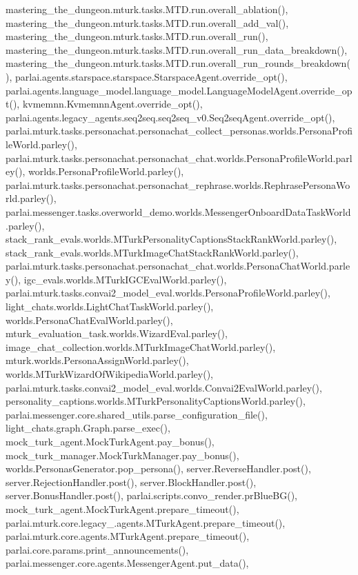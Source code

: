 mastering\+\_\+the\+\_\+dungeon.\+mturk.\+tasks.\+M\+T\+D.\+run.\+overall\+\_\+ablation(), mastering\+\_\+the\+\_\+dungeon.\+mturk.\+tasks.\+M\+T\+D.\+run.\+overall\+\_\+add\+\_\+val(), mastering\+\_\+the\+\_\+dungeon.\+mturk.\+tasks.\+M\+T\+D.\+run.\+overall\+\_\+run(), mastering\+\_\+the\+\_\+dungeon.\+mturk.\+tasks.\+M\+T\+D.\+run.\+overall\+\_\+run\+\_\+data\+\_\+breakdown(), mastering\+\_\+the\+\_\+dungeon.\+mturk.\+tasks.\+M\+T\+D.\+run.\+overall\+\_\+run\+\_\+rounds\+\_\+breakdown(), parlai.\+agents.\+starspace.\+starspace.\+Starspace\+Agent.\+override\+\_\+opt(), parlai.\+agents.\+language\+\_\+model.\+language\+\_\+model.\+Language\+Model\+Agent.\+override\+\_\+opt(), kvmemnn.\+Kvmemnn\+Agent.\+override\+\_\+opt(), parlai.\+agents.\+legacy\+\_\+agents.\+seq2seq.\+seq2seq\+\_\+v0.\+Seq2seq\+Agent.\+override\+\_\+opt(), parlai.\+mturk.\+tasks.\+personachat.\+personachat\+\_\+collect\+\_\+personas.\+worlds.\+Persona\+Profile\+World.\+parley(), parlai.\+mturk.\+tasks.\+personachat.\+personachat\+\_\+chat.\+worlds.\+Persona\+Profile\+World.\+parley(), worlds.\+Persona\+Profile\+World.\+parley(), parlai.\+mturk.\+tasks.\+personachat.\+personachat\+\_\+rephrase.\+worlds.\+Rephrase\+Persona\+World.\+parley(), parlai.\+messenger.\+tasks.\+overworld\+\_\+demo.\+worlds.\+Messenger\+Onboard\+Data\+Task\+World.\+parley(), stack\+\_\+rank\+\_\+evals.\+worlds.\+M\+Turk\+Personality\+Captions\+Stack\+Rank\+World.\+parley(), stack\+\_\+rank\+\_\+evals.\+worlds.\+M\+Turk\+Image\+Chat\+Stack\+Rank\+World.\+parley(), parlai.\+mturk.\+tasks.\+personachat.\+personachat\+\_\+chat.\+worlds.\+Persona\+Chat\+World.\+parley(), igc\+\_\+evals.\+worlds.\+M\+Turk\+I\+G\+C\+Eval\+World.\+parley(), parlai.\+mturk.\+tasks.\+convai2\+\_\+model\+\_\+eval.\+worlds.\+Persona\+Profile\+World.\+parley(), light\+\_\+chats.\+worlds.\+Light\+Chat\+Task\+World.\+parley(), worlds.\+Persona\+Chat\+Eval\+World.\+parley(), mturk\+\_\+evaluation\+\_\+task.\+worlds.\+Wizard\+Eval.\+parley(), image\+\_\+chat\+\_\+collection.\+worlds.\+M\+Turk\+Image\+Chat\+World.\+parley(), mturk.\+worlds.\+Persona\+Assign\+World.\+parley(), worlds.\+M\+Turk\+Wizard\+Of\+Wikipedia\+World.\+parley(), parlai.\+mturk.\+tasks.\+convai2\+\_\+model\+\_\+eval.\+worlds.\+Convai2\+Eval\+World.\+parley(), personality\+\_\+captions.\+worlds.\+M\+Turk\+Personality\+Captions\+World.\+parley(), parlai.\+messenger.\+core.\+shared\+\_\+utils.\+parse\+\_\+configuration\+\_\+file(), light\+\_\+chats.\+graph.\+Graph.\+parse\+\_\+exec(), mock\+\_\+turk\+\_\+agent.\+Mock\+Turk\+Agent.\+pay\+\_\+bonus(), mock\+\_\+turk\+\_\+manager.\+Mock\+Turk\+Manager.\+pay\+\_\+bonus(), worlds.\+Personas\+Generator.\+pop\+\_\+persona(), server.\+Reverse\+Handler.\+post(), server.\+Rejection\+Handler.\+post(), server.\+Block\+Handler.\+post(), server.\+Bonus\+Handler.\+post(), parlai.\+scripts.\+convo\+\_\+render.\+pr\+Blue\+B\+G(), mock\+\_\+turk\+\_\+agent.\+Mock\+Turk\+Agent.\+prepare\+\_\+timeout(), parlai.\+mturk.\+core.\+legacy\+\_.\+agents.\+M\+Turk\+Agent.\+prepare\+\_\+timeout(), parlai.\+mturk.\+core.\+agents.\+M\+Turk\+Agent.\+prepare\+\_\+timeout(), parlai.\+core.\+params.\+print\+\_\+announcements(), parlai.\+messenger.\+core.\+agents.\+Messenger\+Agent.\+put\+\_\+data(), 
